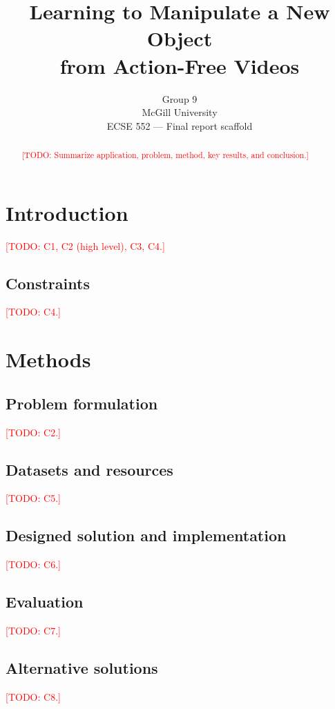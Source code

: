 \documentclass{article}
\title{Learning to Manipulate a New Object\\from Action-Free Videos}
\author{
  Group 9 \\
  McGill University \\
  ECSE 552 --- Final report scaffold
}
\newcommand{\todo}[1]{\textcolor{red}{[TODO: #1]}}
\begin{document}
\maketitle

\begin{abstract}
  \todo{Summarize application, problem, method, key results, and conclusion.}
\end{abstract}

\section{Introduction}
\todo{C1, C2 (high level), C3, C4.}

\subsection{Constraints}
\todo{C4.}

\section{Methods}

\subsection{Problem formulation}
\todo{C2.}

\subsection{Datasets and resources}
\todo{C5.}

\subsection{Designed solution and implementation}
\todo{C6.}

\subsection{Evaluation}
\todo{C7.}

\subsection{Alternative solutions}
\todo{C8.}
\end{document}
